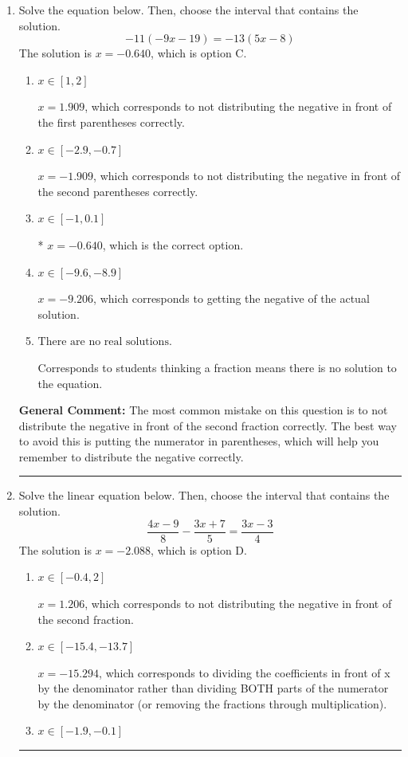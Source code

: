 \documentclass{extbook}[14pt]
\newcommand{\litem}[1]{\item #1

\rule{\textwidth}{0.4pt}}
\begin{document}
\begin{enumerate}\litem{
Solve the equation below. Then, choose the interval that contains the solution.
\[ -11(-9x -19) = -13(5x -8) \]The solution is \( x = -0.640 \), which is option C.\begin{enumerate}[label=\Alph*.]
\item \( x \in [1, 2] \)

$x = 1.909$, which corresponds to not distributing the negative in front of the first parentheses correctly.
\item \( x \in [-2.9, -0.7] \)

$x = -1.909$, which corresponds to not distributing the negative in front of the second parentheses correctly.
\item \( x \in [-1, 0.1] \)

* $x = -0.640$, which is the correct option.
\item \( x \in [-9.6, -8.9] \)

$x = -9.206$, which corresponds to getting the negative of the actual solution.
\item \( \text{There are no real solutions.} \)

Corresponds to students thinking a fraction means there is no solution to the equation.
\end{enumerate}

\textbf{General Comment:} The most common mistake on this question is to not distribute the negative in front of the second fraction correctly. The best way to avoid this is putting the numerator in parentheses, which will help you remember to distribute the negative correctly.
}
\litem{
Solve the linear equation below. Then, choose the interval that contains the solution.
\[ \frac{4x -9}{8} - \frac{3x + 7}{5} = \frac{3x -3}{4} \]The solution is \( x = -2.088 \), which is option D.\begin{enumerate}[label=\Alph*.]
\item \( x \in [-0.4, 2] \)

 $x = 1.206$, which corresponds to not distributing the negative in front of the second fraction.
\item \( x \in [-15.4, -13.7] \)

 $x = -15.294$, which corresponds to dividing the coefficients in front of x by the denominator rather than dividing BOTH parts of the numerator by the denominator (or removing the fractions through multiplication).
\item \( x \in [-1.9, -0.1] \)


\end{enumerate}}
\end{enumerate}
\end{document}
